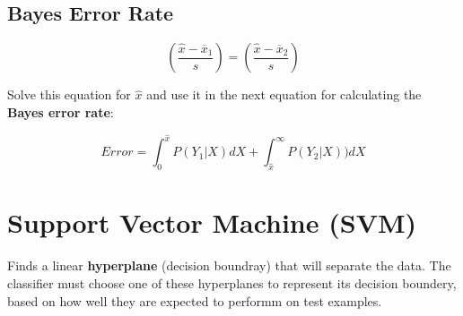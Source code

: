 		\subsection{Bayes Error Rate}

			\begin{equation}
				(\frac{\hat{x} - \overline{x}_1}{s}) = (\frac{\hat{x} - \overline{x}_2}{s} )
			\end{equation}

			Solve this equation for $\hat{x}$ and use it in the next equation for calculating
			the {\bf Bayes error rate}:

			\begin{equation}
				Error = \int_{0}^{\hat{x}} P(Y_{1}|X) dX + \int_{\hat{x}}^{\infty} P(Y_{2}|X)) dX
			\end{equation}

	\section{Support Vector Machine (SVM)}

		Finds a linear {\bf hyperplane} (decision boundray) that will separate the data. 
		The classifier must choose one of these hyperplanes to represent its decision
		boundery, based on how well they are expected to performm on test examples. 

